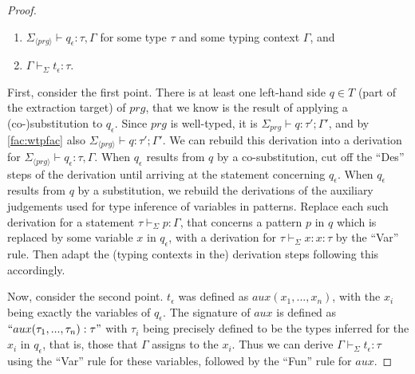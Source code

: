 \begin{lemma}
\begin{proof}
\begin{enumerate}
\item $\Sigma_{\langle prg \rangle} \vdash q_\epsilon : \tau, \Gamma$ for some type $\tau$ and some typing context $\Gamma$, and

\item $\Gamma \vdash_{\Sigma} t_\epsilon : \tau$.
\end{enumerate}
First, consider the first point. There is at least one left-hand side $q \in T$ (part of the extraction target) of $prg$, that we know is the result of applying a (co-)substitution to $q_\epsilon$. Since $prg$ is well-typed, it is $\Sigma_{prg} \vdash q : \tau'; \Gamma'$, and by \autoref{fac:wtpfac} also $\Sigma_{\langle prg \rangle} \vdash q : \tau'; \Gamma'$. We can rebuild this derivation into a derivation for $\Sigma_{\langle prg \rangle} \vdash q_\epsilon : \tau, \Gamma$. When $q_\epsilon$ results from $q$ by a co-substitution, cut off the ``Des'' steps of the derivation until arriving at the statement concerning $q_\epsilon$. When $q_\epsilon$ results from $q$ by a substitution, we rebuild the derivations of the auxiliary judgements used for type inference of variables in patterns. Replace each such derivation for a statement $\tau \vdash_{\Sigma} p : \Gamma$, that concerns a pattern $p$ in $q$ which is replaced by some variable $x$ in $q_\epsilon$, with a derivation for $\tau \vdash_{\Sigma} x : x:\tau$ by the ``Var'' rule. Then adapt the (typing contexts in the) derivation steps following this accordingly.

Now, consider the second point. $t_\epsilon$ was defined as $aux(x_1, ..., x_n)$, with the $x_i$ being exactly the variables of $q_\epsilon$. The signature of $aux$ is defined as $`` aux(\tau_1, ..., \tau_n): \tau "$ with $\tau_i$ being precisely defined to be the types inferred for the $x_i$ in $q_\epsilon$, that is, those that $\Gamma$ assigns to the $x_i$. Thus we can derive $\Gamma \vdash_{\Sigma} t_\epsilon : \tau$ using the ``Var'' rule for these variables, followed by the ``Fun'' rule for $aux$.
\end{proof}
\end{lemma}

